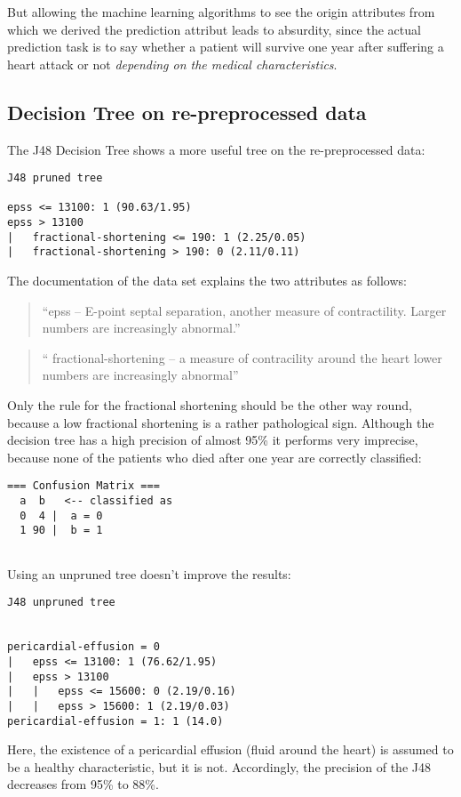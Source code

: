 \documentclass[paper=a4, fontsize=11pt]{scrartcl} %
\numberwithin{equation}{section} %
\numberwithin{figure}{section} %
\numberwithin{table}{section} %
\begin{document}
But allowing the machine learning algorithms to see the origin attributes from which we derived the prediction attribut leads to absurdity, since the actual prediction task is to say whether a patient will survive one year after suffering a heart attack or not \emph{depending on the medical characteristics}.


\subsection{Decision Tree on re-preprocessed data}

The J48 Decision Tree shows a more useful tree on the re-preprocessed data:
\begin{lstlisting}
J48 pruned tree

epss <= 13100: 1 (90.63/1.95)
epss > 13100
|   fractional-shortening <= 190: 1 (2.25/0.05)
|   fractional-shortening > 190: 0 (2.11/0.11)
\end{lstlisting}

The documentation of the data set explains the two attributes as follows:
\begin{quote}
``epss -- E-point septal separation, another measure of contractility. Larger numbers are increasingly abnormal.''
\end{quote}
\begin{quote}
`` fractional-shortening -- a measure of contracility around the heart lower numbers are increasingly abnormal''
\end{quote}

Only the rule for the fractional shortening should be the other way round, because a low fractional shortening is a rather pathological sign. Although the decision tree has a high precision of almost 95\% it performs very imprecise, because none of the patients who died after one year are correctly classified:

\begin{lstlisting}
=== Confusion Matrix ===
  a  b   <-- classified as
  0  4 |  a = 0
  1 90 |  b = 1
    
\end{lstlisting}

Using an unpruned tree doesn't improve the results:
\begin{lstlisting}
J48 unpruned tree


pericardial-effusion = 0
|   epss <= 13100: 1 (76.62/1.95)
|   epss > 13100
|   |   epss <= 15600: 0 (2.19/0.16)
|   |   epss > 15600: 1 (2.19/0.03)
pericardial-effusion = 1: 1 (14.0)
\end{lstlisting}
Here, the existence of a pericardial effusion (fluid around the heart) is assumed to be a healthy characteristic, but it is not. Accordingly, the precision of the J48 decreases from 95\% to 88\%.
\end{document}
